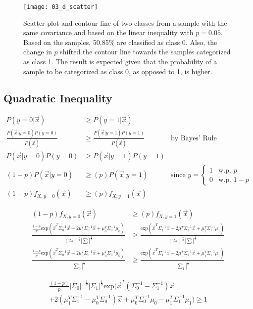 \documentclass[12pt, a4paper, titlepage, fleqn]{article}
\begin{document}
\begin{figure}[h!]
	\centering
	\texttt{[image: 03\_d\_scatter]}
	\caption{Scatter plot and contour line of two classes from a sample with the same covariance and based on the linear inequality with $p=0.05$. Based on the samples, 50.85\% are classified as class 0. Also, the change in $p$ shifted the contour line towards the samples categorized as class 1. The result is expected given that the probability of a sample to be categorized as class 0, as opposed to 1, is higher.} 
	\label{fig:contour for p=0.05}
\end{figure}

\subsection{Quadratic Inequality}

\begin{align}
	P(y=0|\vec{x}) & \geq P(y=1|\vec{x})
	\\
	\frac{P(\vec{x}|y=0)P(y=0)}{P(\vec{x})} & \geq \frac{P(\vec{x}|y=1)P(y=1)}{P(\vec{x})} & \text{by Bayes' Rule}
	\\
	P(\vec{x}|y=0)P(y=0) & \geq P(\vec{x}|y=1)P(y=1)
	\\
	(1-p)P(\vec{x}|y=0) & \geq (p)P(\vec{x}|y=1) & \text{since }
	y=
		\begin{cases}
			1	& \text{w.p. } p
			\\
			0	& \text{w.p. } 1-p
		\end{cases}
	\\
	(1-p)f_{X,y=0}(\vec{x}) & \geq (p)f_{X,y=1}(\vec{x})
\end{align}

\begin{align}
	(1-p)f_{X,y=0}(\vec{x}) &\geq (p)f_{X,y=1}(\vec{x})
	\\
	\frac{\frac{1-p}{p}\text{exp}(\vec{x}^T\Sigma_0^{-1}\vec{x}-2\mu_0^T\Sigma_0^{-1}\vec{x}+\mu_0^T\Sigma_0^{-1}\mu_0)}{(2\pi)^{\frac{n}{2}}|\sum|^\frac{1}{2}}
	& \geq
	\frac{\text{exp}(\vec{x}^T\Sigma_1^{-1}\vec{x}-2\mu_1^T\Sigma_1^{-1}\vec{x}+\mu_1^T\Sigma_1^{-1}\mu_1)}{(2\pi)^{\frac{n}{2}}|\sum|^\frac{1}{2}}
	\\
	\frac{\frac{1-p}{p}\text{exp}(\vec{x}^T\Sigma_0^{-1}\vec{x}-2\mu_0^T\Sigma_0^{-1}\vec{x}+\mu_0^T\Sigma_0^{-1}\mu_0)}{|\sum_0|^\frac{1}{2}}
	& \geq
	\frac{\text{exp}(\vec{x}^T\Sigma_1^{-1}\vec{x}-2\mu_1^T\Sigma_1^{-1}\vec{x}+\mu_1^T\Sigma_1^{-1}\mu_1)}{|\sum_1|^\frac{1}{2}}
\end{align}

\begin{multline}
	\frac{(1-p)}{p}|\Sigma_0|^{-\frac{1}{2}}|\Sigma_1|^\frac{1}{2}\text{exp}(\vec{x}^T(\Sigma_0^{-1}-\Sigma_1^{-1})\vec{x}
	\\	
	+2(\mu_1^T\Sigma_1^{-1}-\mu_0^T\Sigma_0^{-1})\vec{x}+\mu_0^T\Sigma_0^{-1}\mu_0-\mu_1^T\Sigma_1^{-1}\mu_1)
	\geq 1
\end{multline}
\end{document}
